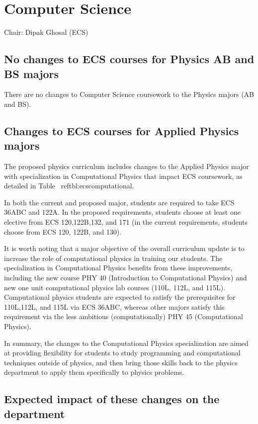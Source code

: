 \documentclass[12pt]{article}
\begin{document}
\newpage
\section{Computer Science}
Chair: Dipak Ghosal (ECS)

\subsection{No changes to ECS courses for Physics AB and BS majors}

There are no changes to Computer Science coursework to the Physics
majors (AB and BS).

\subsection{Changes to ECS courses for Applied Physics majors}

The proposed physics curriculum includes changes to the Applied
Physics major with specialization in Computational Physics that impact
ECS coursework, as detailed in Table~ ref{tbl:ecscomputational}.

In both the current and proposed major, students are required to take
ECS 36ABC and 122A.  In the proposed requirements, students choose at
least one elective from ECS 120,122B,132, and 171 (in the current
requirements, students choose from ECS 120, 122B, and 130).

It is worth noting that a major objective of the overall curriculum
update is to increase the role of computational physics in training
our students.  The specialization in Computational Physics benefits
from these improvements, including the new course PHY 40 (Introduction
to Computational Physics) and new one unit computational physics lab
courses (110L, 112L, and 115L).  Computational physics students are
expected to satisfy the prerequisites for 110L,112L, and 115L via ECS
36ABC, whereas other majors satisfy this requirement via the less
ambitious (computationally) PHY 45 (Computational Physics).

In summary, the changes to the Computational Physics specialization
are aimed at providing flexibility for students to study programming
and computational techniques outside of physics, and then bring those
skills back to the physics department to apply them specifically to
physics problems.

\subsection{Expected impact of these changes on the department}
\end{document}

